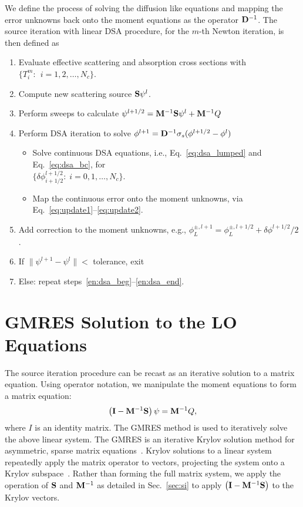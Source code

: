 We define the process of solving the diffusion like equations and mapping the error
unknowns back onto the moment equations as the operator $\mathbf{D}^{-1}$.
The source iteration with linear DSA procedure, for the $m$-th Newton iteration, is then defined as
\begin{enumerate}
    \item Evaluate effective scattering and absorption cross sections with
        ${\{T^m_i:\;\, i=1,2,\ldots,N_c\}}$.
    \item\label{en:dsa_beg} Compute new scattering source $\mathbf{S} \psi^l$.
    \item Perform sweeps to calculate $\psi^{l+1/2} = \mathbf{M}^{-1} \mathbf{S}\psi^{l} + \mathbf{M}^{-1} Q$
    \item Perform DSA iteration to solve $\phi^{l+1} = \mathbf{D}^{-1} \sigma_s(\phi^{l+1/2}-\phi^l)$
        \begin{itemize}
    \item Solve continuous DSA equations, i.e., Eq.~\eqref{eq:dsa_lumped} and
        Eq.~\eqref{eq:dsa_bc}, for \\${\{\delta
            \phi^{l+1/2}_{i+1/2}:\;i=0,1,\ldots,N_c\}}$.
        \item Map the continuous error onto the moment unknowns, via
            Eq.~\eqref{eq:update1}--\eqref{eq:update2}.
    \end{itemize}
    \item Add correction to the moment unknowns, e.g., $\phi_L^{\pm,l+1} = \phi_L^{\pm,l+1/2} +
        \delta \phi^{l+1/2}/2$.
    \item\label{en:dsa_end} If $\|\psi^{l+1} - \psi^{l} \| < $ tolerance, exit
    \item Else: repeat steps~\ref{en:dsa_beg}--\ref{en:dsa_end}.
\end{enumerate}

\section{GMRES Solution to the LO Equations}

The source iteration procedure can be recast as an iterative solution to a matrix
equation. Using operator notation, we manipulate
the moment equations to form a matrix equation:
\begin{equation}
    \left(\mathbf{I}  - \mathbf{M}^{-1}\mathbf{S}\right) \psi = \mathbf{M}^{-1} Q,
\end{equation}
where $I$ is an identity matrix.  The GMRES method is used to iteratively solve the above
linear system. The GMRES is an iterative Krylov solution method for asymmetric, sparse matrix
equations~\cite{saad}.   Krylov solutions to a linear system repeatedly apply the
matrix operator to vectors, projecting the system onto a Krylov
subspace~\cite{saad}.  Rather than forming the full matrix system, we apply the
operation of $\mathbf{S}$ and $\mathbf{M}^{-1}$ as detailed in Sec.~\eqref{sec:si} to apply $\left(\mathbf{I}  - \mathbf{M}^{-1}\mathbf{S}\right)$ to the Krylov vectors. 

